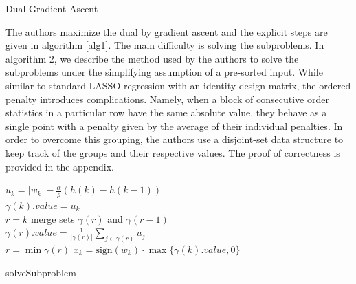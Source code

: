 \documentclass{uwstat572}
\theoremstyle{remark}
\theoremstyle{definition}
\begin{document}
\begin{algorithm}[!htp]
\caption{Dual Gradient Ascent}\label{alg1}
\end{algorithm}

The authors maximize the dual by gradient ascent and the explicit steps are given in algorithm \ref{alg1}.  The main difficulty is solving the subproblems. In algorithm 2, we describe the method used by the authors to solve the subproblems under the simplifying assumption of a pre-sorted input.  While similar to standard LASSO regression with an identity design matrix, the ordered penalty introduces complications.  Namely, when a block of consecutive order statistics in a particular row have the same absolute value, they behave as a single point with a penalty given by the average of their individual penalties.  In order to overcome this grouping, the authors use a disjoint-set data structure to keep track of the groups and their respective values. The proof of correctness is provided in the appendix.

\begin{algorithm}[!htp]
    {
        $u_k = |w_k| - \frac{\alpha}{\rho} (h(k) - h(k-1))$
        \\
        $\gamma(k).value = u_k$
        \\
        $r = k$
            {
                merge sets $\gamma(r)$ and $\gamma(r-1)$
                \\
                $\gamma(r).value = \frac{1}{|\gamma(r)|} \sum_{j \in \gamma(r)} u_j$
                \\
                $r = \min \gamma(r)$
        }
    }
    {
        $x_k = {\text{sign}}(w_k) \cdot \max\{\gamma(k).value,0\}$
    }
    \caption{solveSubproblem}\label{alg2}
\end{algorithm}
\end{document}
